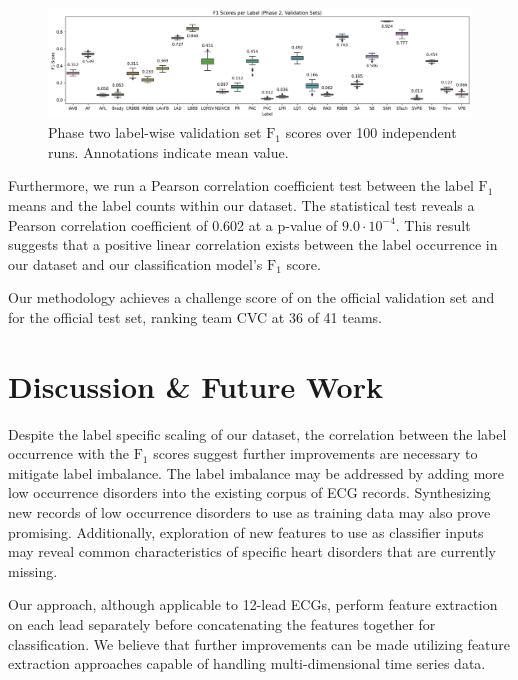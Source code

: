 \documentclass[twocolumn]{cinc}
\begin{document}
\begin{figure}[ht]
  \centering
  \includegraphics[width=17.0cm]{fig/label_f1s.png}
  \caption{Phase two label-wise validation set $\text{F}_1$ scores over 100 independent runs. Annotations indicate mean value.}
  \label{fig:f1_score}
\end{figure}

Furthermore, we run a Pearson correlation coefficient test between the label $\text{F}_1$ means and the label counts within our dataset.
The statistical test reveals a Pearson correlation coefficient of 0.602 at a p-value of $9.0 \cdot 10^{-4}$.
This result suggests that a positive linear correlation exists between the label occurrence in our dataset and our classification model's $\text{F}_1$ score.

Our methodology achieves a challenge score of \officialvalscore on the official validation set and \officialtestscore for the official test set, ranking team CVC at 36 of 41 teams.

\section{Discussion \& Future Work}

Despite the label specific scaling of our dataset, the correlation between the label occurrence with the $\text{F}_1$ scores suggest further improvements are necessary to mitigate label imbalance.
The label imbalance may be addressed by adding more low occurrence disorders into the existing corpus of ECG records.
Synthesizing new records of low occurrence disorders to use as training data may also prove promising.
Additionally, exploration of new features to use as classifier inputs may reveal common characteristics of specific heart disorders that are currently missing.

Our approach, although applicable to 12-lead ECGs, perform feature extraction on each lead separately before concatenating the features together for classification.
We believe that further improvements can be made utilizing feature extraction approaches capable of handling multi-dimensional time series data.
\end{document}
